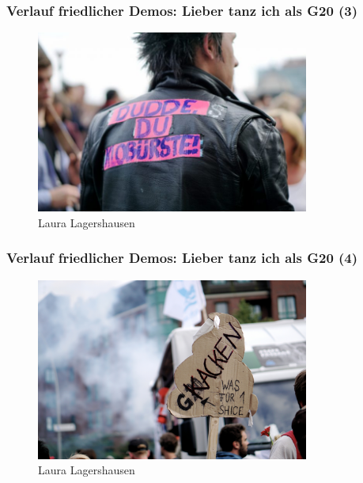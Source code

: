 \documentclass[]{beamer}
\begin{document}
	\begin{frame}
	\frametitle{Verlauf friedlicher Demos: Lieber tanz ich als G20 (3)}
	\begin{figure}
		\renewcommand{\figurename}{Foto} 
		\includegraphics[width=0.8\textwidth]{images/lieber-tanz-ich-als-g20-3}
		\caption{Laura Lagershausen }
	\end{figure}
\end{frame}

	\begin{frame}
	\frametitle{Verlauf friedlicher Demos: Lieber tanz ich als G20 (4)}
	\begin{figure}
		\renewcommand{\figurename}{Foto} 
		\includegraphics[width=0.8\textwidth]{images/lieber-tanz-ich-als-g20-4}
		\caption{Laura Lagershausen }
	\end{figure}
\end{frame}
\end{document}
